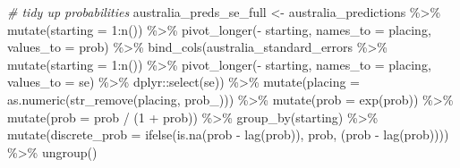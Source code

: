 \documentclass[
]{book}
\newenvironment{Shaded}{\begin{snugshade}}{\end{snugshade}}
\newcommand{\AttributeTok}[1]{\textcolor[rgb]{0.77,0.63,0.00}{#1}}
\newcommand{\CommentTok}[1]{\textcolor[rgb]{0.56,0.35,0.01}{\textit{#1}}}
\newcommand{\DecValTok}[1]{\textcolor[rgb]{0.00,0.00,0.81}{#1}}
\newcommand{\FunctionTok}[1]{\textcolor[rgb]{0.00,0.00,0.00}{#1}}
\newcommand{\NormalTok}[1]{#1}
\newcommand{\OtherTok}[1]{\textcolor[rgb]{0.56,0.35,0.01}{#1}}
\newcommand{\SpecialCharTok}[1]{\textcolor[rgb]{0.00,0.00,0.00}{#1}}
\newcommand{\StringTok}[1]{\textcolor[rgb]{0.31,0.60,0.02}{#1}}
\begin{document}
\begin{Shaded}
\begin{Highlighting}[]
\CommentTok{\# tidy up probabilities}
\NormalTok{australia\_preds\_se\_full }\OtherTok{\textless{}{-}}\NormalTok{ australia\_predictions }\SpecialCharTok{\%\textgreater{}\%}
  \FunctionTok{mutate}\NormalTok{(}\AttributeTok{starting =} \DecValTok{1}\SpecialCharTok{:}\FunctionTok{n}\NormalTok{()) }\SpecialCharTok{\%\textgreater{}\%}
  \FunctionTok{pivot\_longer}\NormalTok{(}\SpecialCharTok{{-}}\NormalTok{ starting, }\AttributeTok{names\_to =} \StringTok{\textquotesingle{}placing\textquotesingle{}}\NormalTok{, }\AttributeTok{values\_to =} \StringTok{\textquotesingle{}prob\textquotesingle{}}\NormalTok{) }\SpecialCharTok{\%\textgreater{}\%} 
  \FunctionTok{bind\_cols}\NormalTok{(australia\_standard\_errors }\SpecialCharTok{\%\textgreater{}\%} \FunctionTok{mutate}\NormalTok{(}\AttributeTok{starting =} \DecValTok{1}\SpecialCharTok{:}\FunctionTok{n}\NormalTok{()) }\SpecialCharTok{\%\textgreater{}\%}
  \FunctionTok{pivot\_longer}\NormalTok{(}\SpecialCharTok{{-}}\NormalTok{ starting, }\AttributeTok{names\_to =} \StringTok{\textquotesingle{}placing\textquotesingle{}}\NormalTok{, }\AttributeTok{values\_to =} \StringTok{\textquotesingle{}se\textquotesingle{}}\NormalTok{) }\SpecialCharTok{\%\textgreater{}\%}
\NormalTok{    dplyr}\SpecialCharTok{::}\FunctionTok{select}\NormalTok{(se)) }\SpecialCharTok{\%\textgreater{}\%}
  \FunctionTok{mutate}\NormalTok{(}\AttributeTok{placing =} \FunctionTok{as.numeric}\NormalTok{(}\FunctionTok{str\_remove}\NormalTok{(placing, }\StringTok{\textquotesingle{}prob\_\textquotesingle{}}\NormalTok{))) }\SpecialCharTok{\%\textgreater{}\%}
  \FunctionTok{mutate}\NormalTok{(}\AttributeTok{prob =} \FunctionTok{exp}\NormalTok{(prob)) }\SpecialCharTok{\%\textgreater{}\%}
  \FunctionTok{mutate}\NormalTok{(}\AttributeTok{prob =}\NormalTok{ prob }\SpecialCharTok{/}\NormalTok{ (}\DecValTok{1} \SpecialCharTok{+}\NormalTok{ prob)) }\SpecialCharTok{\%\textgreater{}\%}
  \FunctionTok{group\_by}\NormalTok{(starting) }\SpecialCharTok{\%\textgreater{}\%} 
  \FunctionTok{mutate}\NormalTok{(}\AttributeTok{discrete\_prob =} \FunctionTok{ifelse}\NormalTok{(}\FunctionTok{is.na}\NormalTok{(prob }\SpecialCharTok{{-}} \FunctionTok{lag}\NormalTok{(prob)), prob, (prob }\SpecialCharTok{{-}} \FunctionTok{lag}\NormalTok{(prob)))) }\SpecialCharTok{\%\textgreater{}\%}
  \FunctionTok{ungroup}\NormalTok{()}


\end{Highlighting}
\end{Shaded}
\end{document}
